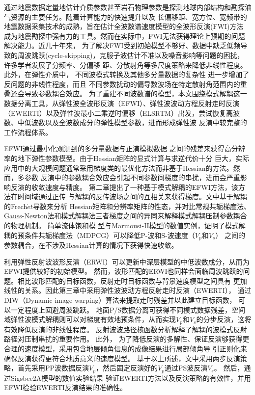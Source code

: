\begin{cabstract}
	通过地震数据定量地估计介质参数甚至岩石物理参数是探测地球内部结构和勘探油气资源的主要任务。随着计算能力的快速提升以及
	长偏移距、宽方位、宽频带的地震数据采集技术的成熟，旨在估计全波数谱速度模型的全波形反演(FWI)方法
	成为地震勘探中强有力的工具。然而在实际中，FWI无法获得理论上预期的问题解决能力。近几十年来，
	为了解决FWI受到初始模型不够好、数据中缺乏低频导致的周波跳跃(cycle-skipping)，克服子波估计不准以及噪音影响等问题的困扰，
	许多学者发展了分频率、分偏移
	距、分散射角等多尺度策略来降低非线性程度。此外，在弹性介质中，
	不同波模式转换及其他多分量数据的复杂性
	进一步增加了反问题的非线性程度，而且
	不同参数扰动的偏导数波场在特定散射角范围内的重叠还会导致参数耦合效应。
	为了重建不同波数谱的模型，本文围绕模式解耦这一数据分离工具，从弹性波全波形反演（EFWI）、弹性波波动方程反射走时反演
	（EWERTI）以及弹性波最小二乘逆时偏移（ELSRTM）出发，尝试恢复高波数、中低波数以及全波数成分的弹性模型参数，进而形成弹性波
	反演中较完整的工作流程体系。

	EFWI通过最小化观测到的多分量数据与正演模拟数据
	之间的残差来获得高分辨率的地下弹性参数模型。由于Hessian矩阵的显式计算与求逆代价十分
	巨大，实际应用中的大规模问题通常采用梯度类的最优化方法而非基于Hessian的方法。然而，多参数
	反演中的参数耦合效应会引起不同参数间梯度的串扰，进而会严重影响反演的收敛速度与精度。
	第二章提出了一种基于模式解耦的EFWI方法，该方法在时间域通过正传
	与解耦的反传波场之间的互相关来获得梯度。文中基于解耦的Frech$\acute{e}t$导数来分析
	Hessian矩阵和分辨率矩阵的性态，并对比常规共轭梯度法、Gauss-Newton法和模式解耦法三者梯度之间的异同来解释模式解耦压制参数耦合的物理机制。
	简单流体饱和模
	型与Marmousi-II模型的数值实例，证明了模式解耦的预条件共轭梯度法（MDPCG）可以降低P-波和S-波速度（$V_p$和$V_s$）
	之间的参数耦合，在不涉及Hessian计算的情况下获得快速收敛。

	利用弹性反射波波形反演（ERWI）可以更新中深层模型的中低波数成分，从而为EFWI提供较好的初始模型。
	然而，波形匹配的ERWI也同样会面临周波跳跃的问题。相比波形匹配的目标函数，反射走时目标函数与背景速度模型之间具有
	更加线性的关系。因此第三章中采用弹性波波动方程反射走时反演（EWERTI），
	通过DIW（Dynamic image warping）算法来提取走时残差并以此建立目标函数，
	可以一定程度上回避周波跳跃。
	地面P/S数据分离可获得不同模式数据残差，空间域弹性波模式解耦则可以对梯度有效地预条件，从而实现$V_p$和$V_s$的分步反演，这将有效降低反演的非线性程度。
	反射波波路径核函数分析解释了解耦的波模式反射路径对压制串扰的重要作用。
	此外，
	为了降低反演的多解性、保证反演够获得更合理的速度模型，采用包含地层倾角信息的成像结果进行局部倾角导
	引正则化来确保反演获得更符合地质意义的速度模型。
	基于以上所述，文中采用两步反演策略，首先采用PP波数据反演$V_p$，然后固定反演好的$V_p$通过PS波反演$V_s$。
	然后，通过Sigsbee2A模型的数值实验结果
	验证EWERTI方法以及反演策略的有效性，并用EFWI检验EWERTI反演结果的准确性。


\end{cabstract}
